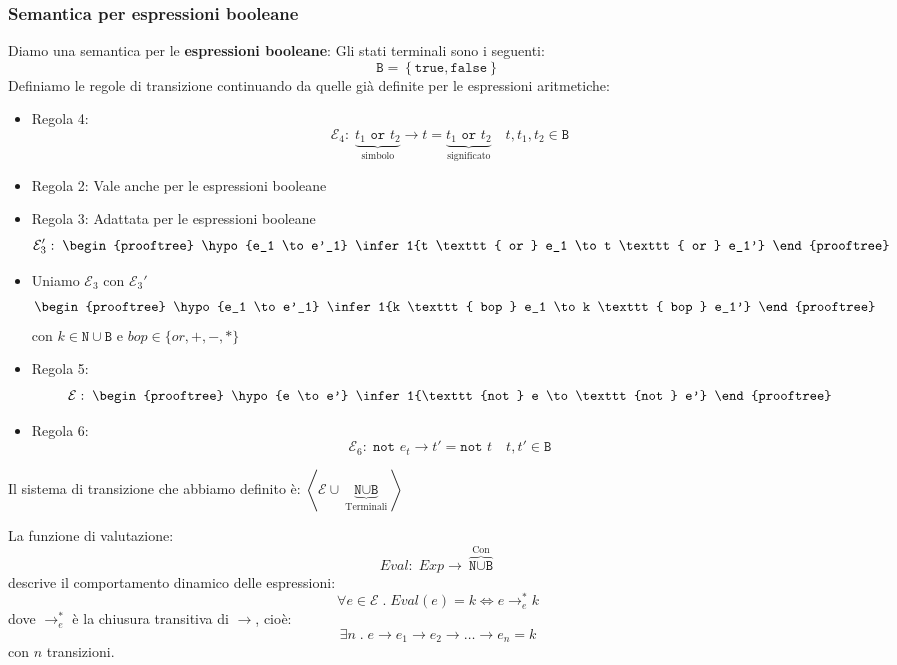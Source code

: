 \documentclass[a4paper]{article}
\begin{document}
\subsubsection{Semantica per espressioni booleane}
Diamo una semantica per le \textbf{espressioni booleane}:
Gli stati terminali sono i seguenti:
\[
  \texttt{B} = \left\{ \texttt{true}, \texttt{false} \right\}
\] 
Definiamo le regole di transizione continuando da quelle già definite per le
espressioni aritmetiche:
\begin{itemize}
  \item Regola 4:
    \[
    \mathcal{E}_4: \; \underbrace{t_1 \texttt{ or } t_2}_\text{simbolo} \to t
    = \underbrace{t_1 \texttt{ or } t_2}_\text{significato}
    \quad t, t_1, t_2 \in \texttt{B}
    \] 

  \item Regola 2: Vale anche per le espressioni booleane

  \item Regola 3: Adattata per le espressioni booleane
    \[
      \mathcal{E}_3':\;
      \begin{prooftree}
        \hypo{e_1 \to e'_1}
        \infer1{t \texttt{ or } e_1 \to t \texttt{ or } e_1'}
      \end{prooftree}
    \] 

  \item Uniamo \( \mathcal{E}_3 \) con \( \mathcal{E}_3' \)
    \[
      \begin{prooftree}
        \hypo{e_1 \to e'_1}
        \infer1{k \texttt{ bop } e_1 \to k \texttt{ bop } e_1'}
      \end{prooftree}
    \] 
    con \( k \in \texttt{N} \cup \texttt{B} \) e \( bop \in \{or, +, -, *\} \)

  \item Regola 5:
    \[
      \mathcal{E}: \;
      \begin{prooftree}
        \hypo{e \to e'}
        \infer1{\texttt{not } e \to \texttt{not } e'}
      \end{prooftree}
    \] 

  \item Regola 6:
    \[
      \mathcal{E}_6: \; \texttt{not } e_t \to t' = \texttt{not } t \quad t, t' \in \texttt{B}
    \] 
\end{itemize}
Il sistema di transizione che abbiamo definito è:
\( \left<\mathcal{E} \cup \underbrace{\texttt{N} \cup \texttt{B} }_{\text{Terminali}} \right>\) 

\begin{definition}[Valutazione]
  La funzione di valutazione:
  \[
    Eval:\; Exp \to \overbrace{\texttt{N} \cup \texttt{B}}^{\text{Con}}
  \] 
  descrive il comportamento dinamico delle espressioni:
  \[
    \forall e \in \mathcal{E} \;.\; Eval(e) = k \iff e \to^*_e k
  \] 
  dove \( \to^*_e \) è la chiusura transitiva di \( \to  \), cioè:
  \[
    \exists n \;.\; e \to e_1 \to e_2 \to \ldots \to e_n = k
  \] 
  con \( n \) transizioni.
\end{definition}
\end{document}
